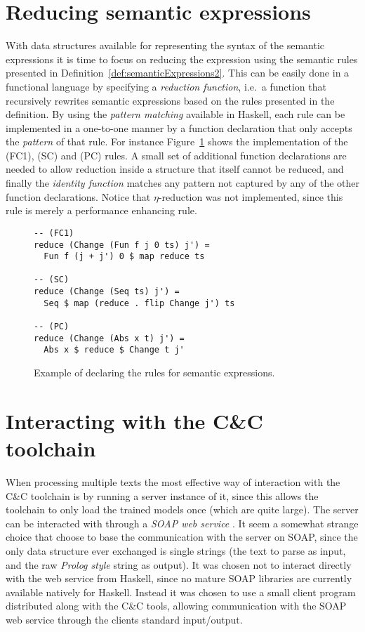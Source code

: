 \section{Reducing semantic expressions}

With data structures available for representing the syntax of the semantic expressions it is time to focus on reducing the expression using the semantic rules presented in Definition~\ref{def:semanticExpressions2}. This can be easily done in a functional language by specifying a \emph{reduction function}, i.e.\ a function that recursively rewrites semantic expressions based on the rules presented in the definition. By using the \emph{pattern matching} available in Haskell, each rule can be implemented in a one-to-one manner by a function declaration that only accepts the \emph{pattern} of that rule. For instance Figure~\ref{fig:reduce} shows the implementation of the (FC1), (SC) and (PC) rules. A small set of additional function declarations are needed to allow reduction inside a structure that itself cannot be reduced, and finally the \emph{identity function} matches any pattern not captured by any of the other function declarations. Notice that $\eta$-reduction was not implemented, since this rule is merely a performance enhancing rule.
\begin{figure}[ht]
\begin{cframed}{.9\textwidth}
\vspace{-8pt}
\begin{lstlisting}[language=GHC]
-- (FC1)
reduce (Change (Fun f j 0 ts) j') = 
  Fun f (j + j') 0 $ map reduce ts

-- (SC)
reduce (Change (Seq ts) j') = 
  Seq $ map (reduce . flip Change j') ts

-- (PC)
reduce (Change (Abs x t) j') = 
  Abs x $ reduce $ Change t j'
\end{lstlisting}	
\end{cframed}
\caption{Example of declaring the rules for semantic expressions.}
\label{fig:reduce}
\end{figure}
\vspace{-1em}

\section{Interacting with the C\&C toolchain}
When processing multiple texts the most effective way of interaction with the C\&C toolchain is by running a server instance of it, since this allows the toolchain to only load the trained models once (which are quite large). The server can be interacted with through a \emph{SOAP web service} \cite{soap}. It seem a somewhat strange choice that \citeauthor{candc} choose to base the communication with the server on SOAP, since the only data structure ever exchanged is single strings (the text to parse as input, and the raw \emph{Prolog style} string as output). It was chosen not to interact directly with the web service from Haskell, since no mature SOAP libraries are currently available natively for Haskell. Instead it was chosen to use a small client program distributed along with the C\&C tools, allowing communication with the SOAP web service through the clients standard input/output.

